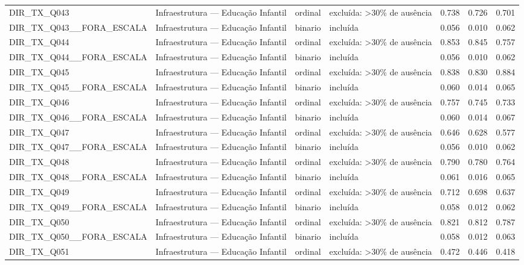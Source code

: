 \begin{tabular}{llllrrr}
DIR\_TX\_Q043 & Infraestrutura — Educação Infantil & ordinal & excluída: >30\% de ausência & 0.738 & 0.726 & 0.701 \\
DIR\_TX\_Q043\_\_FORA\_ESCALA & Infraestrutura — Educação Infantil & binario & incluída & 0.056 & 0.010 & 0.062 \\
DIR\_TX\_Q044 & Infraestrutura — Educação Infantil & ordinal & excluída: >30\% de ausência & 0.853 & 0.845 & 0.757 \\
DIR\_TX\_Q044\_\_FORA\_ESCALA & Infraestrutura — Educação Infantil & binario & incluída & 0.056 & 0.010 & 0.062 \\
DIR\_TX\_Q045 & Infraestrutura — Educação Infantil & ordinal & excluída: >30\% de ausência & 0.838 & 0.830 & 0.884 \\
DIR\_TX\_Q045\_\_FORA\_ESCALA & Infraestrutura — Educação Infantil & binario & incluída & 0.060 & 0.014 & 0.065 \\
DIR\_TX\_Q046 & Infraestrutura — Educação Infantil & ordinal & excluída: >30\% de ausência & 0.757 & 0.745 & 0.733 \\
DIR\_TX\_Q046\_\_FORA\_ESCALA & Infraestrutura — Educação Infantil & binario & incluída & 0.060 & 0.014 & 0.067 \\
DIR\_TX\_Q047 & Infraestrutura — Educação Infantil & ordinal & excluída: >30\% de ausência & 0.646 & 0.628 & 0.577 \\
DIR\_TX\_Q047\_\_FORA\_ESCALA & Infraestrutura — Educação Infantil & binario & incluída & 0.056 & 0.010 & 0.062 \\
DIR\_TX\_Q048 & Infraestrutura — Educação Infantil & ordinal & excluída: >30\% de ausência & 0.790 & 0.780 & 0.764 \\
DIR\_TX\_Q048\_\_FORA\_ESCALA & Infraestrutura — Educação Infantil & binario & incluída & 0.061 & 0.016 & 0.065 \\
DIR\_TX\_Q049 & Infraestrutura — Educação Infantil & ordinal & excluída: >30\% de ausência & 0.712 & 0.698 & 0.637 \\
DIR\_TX\_Q049\_\_FORA\_ESCALA & Infraestrutura — Educação Infantil & binario & incluída & 0.058 & 0.012 & 0.062 \\
DIR\_TX\_Q050 & Infraestrutura — Educação Infantil & ordinal & excluída: >30\% de ausência & 0.821 & 0.812 & 0.787 \\
DIR\_TX\_Q050\_\_FORA\_ESCALA & Infraestrutura — Educação Infantil & binario & incluída & 0.058 & 0.012 & 0.063 \\
DIR\_TX\_Q051 & Infraestrutura — Educação Infantil & ordinal & excluída: >30\% de ausência & 0.472 & 0.446 & 0.418 \\

\end{tabular}
